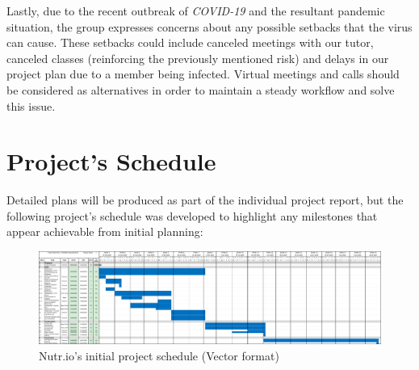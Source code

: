 \documentclass{article}
\begin{document}
Lastly, due to the recent outbreak of \textit{COVID-19} and the resultant pandemic situation, the group expresses concerns about any possible setbacks that the virus can cause. These setbacks could include canceled meetings with our tutor, canceled classes (reinforcing the previously mentioned risk) and delays in our project plan due to a member being infected. Virtual meetings and calls should be considered as alternatives in order to maintain a steady workflow and solve this issue. 

\section{Project's Schedule}

Detailed plans will be produced as part of the individual project report, but the following project's schedule was developed to highlight any milestones that appear achievable from initial planning:\\

\begin{figure}[H]
    \centering
    \includegraphics[scale=0.2]{pictures/Nutr.io project schedule.pdf}
    \caption{Nutr.io's initial project schedule (Vector format)}
    \label{fig:Nutr.io project's schedule}
\end{figure}
\end{document}
